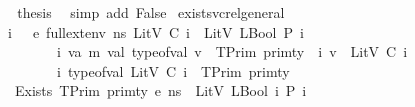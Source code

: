 \begin{isabellebody}
\ \ \isamarkupfalse%
\ \isamarkupfalse%
\ {\isacharquery}{\kern0pt}thesis\ \isamarkupfalse%
\ {\isacharparenleft}{\kern0pt}simp\ add{\isacharcolon}{\kern0pt}\ False{\isacharparenright}{\kern0pt}\isanewline
{}\isamarkupfalse%
%
\endisatagproof
{\isafoldproof}%
%
\isadelimproof
\isanewline
%
\endisadelimproof
\isanewline
{}\isamarkupfalse%
\ exists{\isacharunderscore}{\kern0pt}vc{\isacharunderscore}{\kern0pt}rel{\isacharunderscore}{\kern0pt}general{\isacharcolon}{\kern0pt}\isanewline
\ \ \ {\isachardoublequoteopen}{\isasymAnd}\ i{\isachardot}{\kern0pt}\ {\isasymLambda}{\isacharcomma}{\kern0pt}{\isasymGamma}{\isacharcomma}{\kern0pt}{\isasymOmega}\ {\isasymturnstile}\ {\isasymlangle}e{\isacharcomma}{\kern0pt}\ full{\isacharunderscore}{\kern0pt}ext{\isacharunderscore}{\kern0pt}env\ ns\ {\isacharparenleft}{\kern0pt}LitV\ {\isacharparenleft}{\kern0pt}C\ i{\isacharparenright}{\kern0pt}{\isacharparenright}{\kern0pt}{\isasymrangle}\ {\isasymDown}\ LitV\ {\isacharparenleft}{\kern0pt}LBool\ {\isacharparenleft}{\kern0pt}P\ i{\isacharparenright}{\kern0pt}{\isacharparenright}{\kern0pt}{\isachardoublequoteclose}\isanewline
\ \ \ \ \ \ \ \ \ \ {\isachardoublequoteopen}{\isasymAnd}\ i\ v{\isacharcolon}{\kern0pt}{\isacharcolon}{\kern0pt}{\isacharparenleft}{\kern0pt}{\isacharprime}{\kern0pt}a{\isacharcomma}{\kern0pt}\ {\isacharprime}{\kern0pt}m{\isacharparenright}{\kern0pt}\ val{\isachardot}{\kern0pt}\ type{\isacharunderscore}{\kern0pt}of{\isacharunderscore}{\kern0pt}val\ v\ {\isacharequal}{\kern0pt}\ TPrim\ primty\ {\isasymLongrightarrow}\ {\isasymexists}i{\isachardot}{\kern0pt}\ v\ {\isacharequal}{\kern0pt}\ LitV\ {\isacharparenleft}{\kern0pt}C\ i{\isacharparenright}{\kern0pt}{\isachardoublequoteclose}\isanewline
\ \ \ \ \ \ \ \ \ \ {\isachardoublequoteopen}{\isasymAnd}\ i{\isachardot}{\kern0pt}\ type{\isacharunderscore}{\kern0pt}of{\isacharunderscore}{\kern0pt}val\ {\isacharparenleft}{\kern0pt}LitV\ {\isacharparenleft}{\kern0pt}C\ i{\isacharparenright}{\kern0pt}{\isacharparenright}{\kern0pt}\ {\isacharequal}{\kern0pt}\ TPrim\ primty{\isachardoublequoteclose}\isanewline
\ \ \ {\isachardoublequoteopen}{\isasymLambda}{\isacharcomma}{\kern0pt}{\isasymGamma}{\isacharcomma}{\kern0pt}{\isasymOmega}\ {\isasymturnstile}\ {\isasymlangle}Exists\ {\isacharparenleft}{\kern0pt}TPrim\ primty{\isacharparenright}{\kern0pt}\ e{\isacharcomma}{\kern0pt}\ ns{\isasymrangle}\ {\isasymDown}\ LitV\ {\isacharparenleft}{\kern0pt}LBool\ {\isacharparenleft}{\kern0pt}{\isasymexists}i{\isachardot}{\kern0pt}\ P\ i{\isacharparenright}{\kern0pt}{\isacharparenright}{\kern0pt}{\isachardoublequoteclose}\isanewline

\end{isabellebody}
